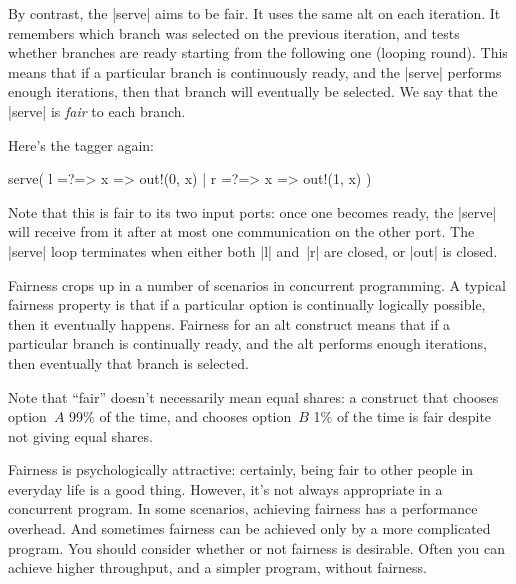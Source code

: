 By contrast, the |serve| aims to be fair.  It uses the same alt on each
iteration.  It remembers which branch was selected on the previous iteration,
and tests whether branches are ready starting from the following one (looping
round).
%
This means that if a particular branch is continuously ready, and the |serve|
performs enough iterations, then that branch will eventually be selected.  We
say that the |serve| is \emph{fair} to each branch.



Here's the tagger again:
%
\begin{scala}
  serve( l =?=> { x => out!(0, x) } | r =?=> { x => out!(1, x) } )
\end{scala}
%
Note that this is fair to its two input ports: once one becomes ready, the
|serve| will receive from it after at most one communication on the other
port.
%
The |serve| loop terminates when either both |l| and~|r| are closed, or |out|
is closed. 


Fairness crops up in a number of scenarios in concurrent programming.
%
A typical fairness property is that if a particular option is continually
logically possible, then it eventually happens.  Fairness for an alt
construct means that if a particular branch is continually ready, and the
alt performs enough iterations, then eventually that branch is selected.

Note that ``fair'' doesn't necessarily mean equal shares: a construct that
chooses option~$A$ 99\% of the time, and chooses option~$B$ 1\% of the time is
fair despite not giving equal shares.

Fairness is psychologically attractive: certainly, being fair to other people
in everyday life is a good thing.  However, it's not always appropriate in a
concurrent program.  In some scenarios, achieving fairness has a performance
overhead.  And sometimes fairness can be achieved only by a more complicated
program.  You should consider whether or not fairness is desirable.  Often you
can achieve higher throughput, and a simpler program, without fairness.
